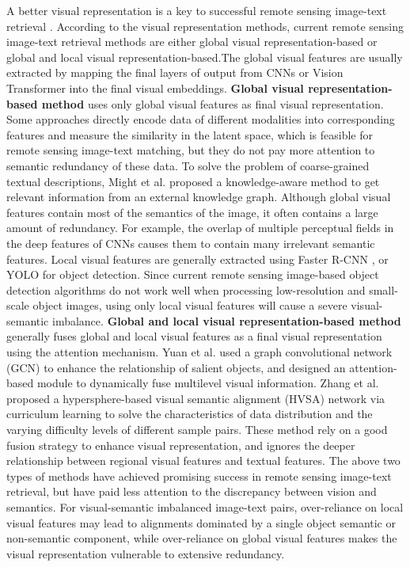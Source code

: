 \documentclass[journal]{IEEEtran}
\begin{document}
A better visual representation is a key to successful remote sensing image-text retrieval \cite{li2022vision}. According to the visual representation methods, current remote sensing image-text retrieval methods are either global visual representation-based or global and local visual representation-based.\IEEEpubidadjcol The global visual features are usually extracted by mapping the final layers of output from CNNs \cite{lecun1998gradient} or Vision Transformer \cite{dosovitskiy2020image} into the final visual embeddings. \textbf{Global visual representation-based method} \cite{mao2018deep, abdullah2020textrs, lv2021fusion, cheng2021deep, mi2022knowledge} uses only global visual features as final visual representation. Some approaches \cite{mao2018deep, abdullah2020textrs} directly encode data of different modalities into corresponding features and measure the similarity in the latent space, which is feasible for remote sensing image-text matching, but they do not pay more attention to semantic redundancy of these data. To solve the problem of coarse-grained textual descriptions, Might et al. \cite{mi2022knowledge} proposed a knowledge-aware method to get relevant information from an external knowledge graph. Although global visual features contain most of the semantics of the image, it often contains a large amount of redundancy. For example, the overlap of multiple perceptual fields in the deep features of CNNs causes them to contain many irrelevant semantic features. Local visual features are generally extracted using Faster R-CNN \cite{ren2015faster}, or YOLO \cite{redmon2016you} for object detection. Since current remote sensing image-based object detection algorithms do not work well when processing low-resolution and small-scale object images, using only local visual features will cause a severe visual-semantic imbalance. \textbf{Global and local visual representation-based method} \cite{yuan2022remote, zhang2023hypersphere} generally fuses global and local visual features as a final visual representation using the attention mechanism. Yuan et al. \cite{yuan2022remote} used a graph convolutional network (GCN) \cite{kipf2016semi} to enhance the relationship of salient objects, and designed an attention-based module to dynamically fuse multilevel visual information. Zhang et al. \cite{zhang2023hypersphere} proposed a hypersphere-based visual semantic alignment (HVSA) network via curriculum learning to solve the characteristics of data distribution and the varying difficulty levels of different sample pairs. These method rely on a good fusion strategy to enhance visual representation, and ignores the deeper relationship between regional visual features and textual features. The above two types of methods have achieved promising success in remote sensing image-text retrieval, but have paid less attention to the discrepancy between vision and semantics. For visual-semantic imbalanced image-text pairs, over-reliance on local visual features may lead to alignments dominated by a single object semantic or non-semantic component, while over-reliance on global visual features makes the visual representation vulnerable to extensive redundancy. 
\end{document}

